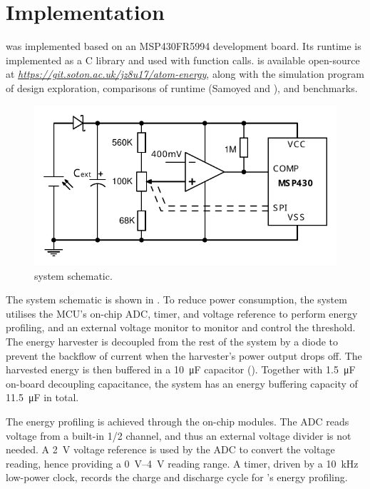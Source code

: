 \section{Implementation} \label{sec:implementation}

\nn{} was implemented based on an MSP430FR5994 development board.
Its runtime is implemented as a C library and used with function calls. 
\nn{} is available open-source at \textit{\url{https://git.soton.ac.uk/jz8u17/atom-energy}}, along with the simulation program of design exploration, comparisons of runtime (Samoyed and \debs{}), and benchmarks.

\begin{figure}[!t]
    \centering
    \includegraphics[width=0.8\columnwidth]{ch5_optic/figures/circuit_v2.pdf}
    \caption{\nn{} system schematic. }
    \label{fig:schematic}
\end{figure}

The system schematic is shown in .
To reduce power consumption, the system utilises the MCU's on-chip ADC, timer, and voltage reference to perform energy profiling, and an external voltage monitor to monitor and control the threshold. 
The energy harvester is decoupled from the rest of the system by a diode to prevent the backflow of current when the harvester's power output drops off.
The harvested energy is then buffered in a \SI{10}{\micro\farad} capacitor (). 
Together with \SI{1.5}{\micro\farad} on-board decoupling capacitance, the system has an energy buffering capacity of \SI{11.5}{\micro\farad} in total. 


The energy profiling is achieved through the on-chip modules.
The ADC reads voltage from a built-in 1/2  channel, and thus an external voltage divider is not needed. 
A \SI{2}{\volt} voltage reference is used by the ADC to convert the voltage reading, hence providing a \SIrange{0}{4}{\volt} reading range. 
A timer, driven by a \SI{10}{\kilo\hertz} low-power clock, records the charge and discharge cycle for \nn{}'s energy profiling.


